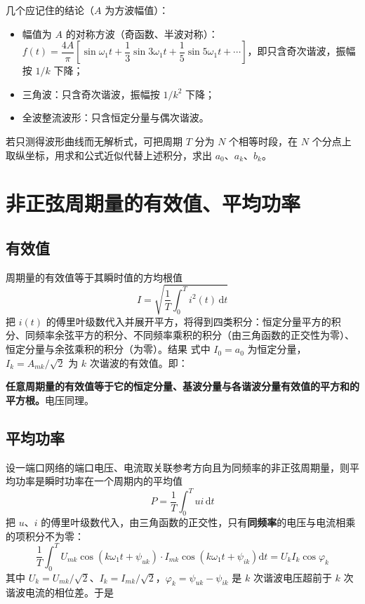 几个应记住的结论（$A$ 为方波幅值）：
\begin{itemize}
  \item 幅值为 $A$ 的对称方波（奇函数、半波对称）：$f(t)=\dfrac{4A}{\pi}\left[\sin\omega_1t+\dfrac{1}{3}\sin3\omega_1t+\dfrac{1}{5}\sin5\omega_1t+\cdots\right]$，即只含奇次谐波，振幅按 $1/k$ 下降；
  \item 三角波：只含奇次谐波，振幅按 $1/k^2$ 下降；
  \item 全波整流波形：只含恒定分量与偶次谐波。
\end{itemize}
若只测得波形曲线而无解析式，可把周期 $T$ 分为 $N$ 个相等时段，在 $N$ 个分点上取纵坐标，用求和公式近似代替上述积分，求出 $a_0$、$a_k$、$b_k$。


\section{非正弦周期量的有效值、平均功率}
\subsection{有效值}
周期量的有效值等于其瞬时值的方均根值
\begin{equation}
I=\sqrt{\frac{1}{T}\int_0^{T}i^2(t)\,\mathrm{d}t}
\end{equation}
把 $i(t)$ 的傅里叶级数代入并展开平方，将得到四类积分：恒定分量平方的积分、同频率余弦平方的积分、不同频率乘积的积分（由三角函数的正交性为零）、恒定分量与余弦乘积的积分（为零）。结果
式中 $I_0=a_0$ 为恒定分量，$I_k=A_{mk}/\sqrt{2}$ 为 $k$ 次谐波的有效值。即：

\textbf{任意周期量的有效值等于它的恒定分量、基波分量与各谐波分量有效值的平方和的平方根。}电压同理。

\subsection{平均功率}
设一端口网络的端口电压、电流取关联参考方向且为同频率的非正弦周期量，则平均功率是瞬时功率在一个周期内的平均值
\begin{equation}
P=\frac{1}{T}\int_0^{T}ui\,\mathrm{d}t
\end{equation}
把 $u$、$i$ 的傅里叶级数代入，由三角函数的正交性，只有\textbf{同频率}的电压与电流相乘的项积分不为零：
\begin{equation}
\frac{1}{T}\int_0^{T}U_{mk}\cos\left(k\omega_1t+\psi_{uk}\right)\cdot I_{mk}\cos\left(k\omega_1t+\psi_{ik}\right)\mathrm{d}t
=U_kI_k\cos\varphi_k
\end{equation}
其中 $U_k=U_{mk}/\sqrt{2}$、$I_k=I_{mk}/\sqrt{2}$，$\varphi_k=\psi_{uk}-\psi_{ik}$ 是 $k$ 次谐波电压超前于 $k$ 次谐波电流的相位差。于是

